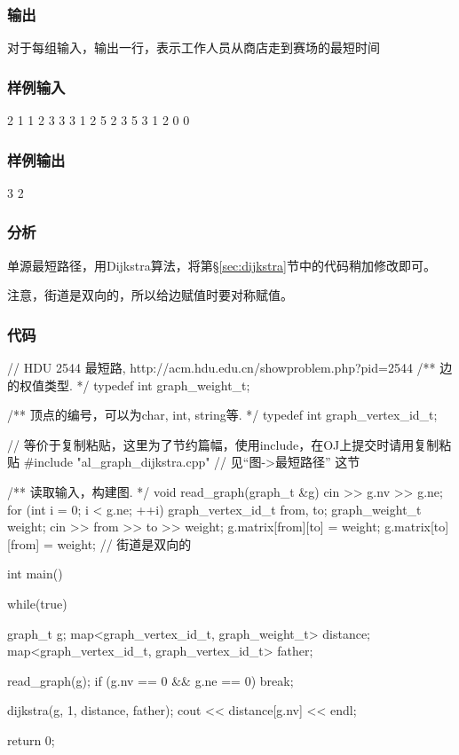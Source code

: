 \subsubsection{输出}
对于每组输入，输出一行，表示工作人员从商店走到赛场的最短时间

\subsubsection{样例输入}
\begin{Code}
2 1
1 2 3
3 3
1 2 5
2 3 5
3 1 2
0 0
\end{Code}

\subsubsection{样例输出}
\begin{Code}
3
2
\end{Code}

\subsubsection{分析}
单源最短路径，用Dijkstra算法，将第\S\ref{sec:dijkstra}节中的代码稍加修改即可。

注意，街道是双向的，所以给边赋值时要对称赋值。

\subsubsection{代码}
\begin{Codex}[label=hdu_2544.cpp]
// HDU 2544 最短路, http://acm.hdu.edu.cn/showproblem.php?pid=2544
/** 边的权值类型. */
typedef int graph_weight_t;

/** 顶点的编号，可以为char, int, string等. */
typedef int graph_vertex_id_t;

// 等价于复制粘贴，这里为了节约篇幅，使用include，在OJ上提交时请用复制粘贴
#include "al_graph_dijkstra.cpp"  // 见“图->最短路径” 这节

/** 读取输入，构建图. */
void read_graph(graph_t &g) {
    cin >> g.nv >> g.ne;
    for (int i = 0; i < g.ne; ++i) {
        graph_vertex_id_t from, to;
        graph_weight_t weight;
        cin >> from >> to >> weight;
        g.matrix[from][to] = weight;
        g.matrix[to][from] = weight;  // 街道是双向的
    }
}


int main() {
    while(true) {
        graph_t g;
        map<graph_vertex_id_t, graph_weight_t> distance;
        map<graph_vertex_id_t, graph_vertex_id_t> father;

        read_graph(g);
        if (g.nv == 0 && g.ne == 0) break;

        dijkstra(g, 1, distance, father);
        cout << distance[g.nv] << endl;
    }

    return 0;
}
\end{Codex}

